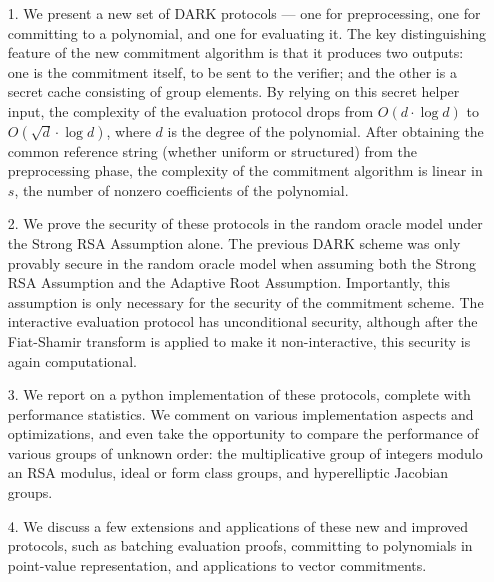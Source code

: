 \documentclass[11pt]{article}
\theoremstyle{Definition}
\begin{document}
\begin{itemize}
\item[1.] We present a new set of DARK protocols --- one for preprocessing, one for committing to a polynomial, and one for evaluating it. The key distinguishing feature of the new commitment algorithm is that it produces two outputs: one is the commitment itself, to be sent to the verifier; and the other is a secret cache consisting of group elements. By relying on this secret helper input, the complexity of the evaluation protocol drops from $O(d \cdot \log d)$ to $O(\sqrt{d} \cdot \log d)$, where $d$ is the degree of the polynomial. After obtaining the common reference string (whether uniform or structured) from the preprocessing phase, the complexity of the commitment algorithm is linear in $s$, the number of nonzero coefficients of the polynomial.

\item[2.] We prove the security of these protocols in the random oracle model under the Strong RSA Assumption alone. The previous DARK scheme was only provably secure in the random oracle model when assuming both the Strong RSA Assumption and the Adaptive Root Assumption. Importantly, this assumption is only necessary for the security of the commitment scheme. The interactive evaluation protocol has unconditional security, although after the Fiat-Shamir transform is applied to make it non-interactive, this security is again computational.

\item[3.] We report on a python implementation of these protocols, complete with performance statistics. We comment on various implementation aspects and optimizations, and even take the opportunity to compare the performance of various groups of unknown order: the multiplicative group of integers modulo an RSA modulus, ideal or form class groups, and hyperelliptic Jacobian groups.

\item[4.] We discuss a few extensions and applications of these new and improved protocols, such as batching evaluation proofs, committing to polynomials in point-value representation, and applications to vector commitments.
\end{itemize}
\end{document}
